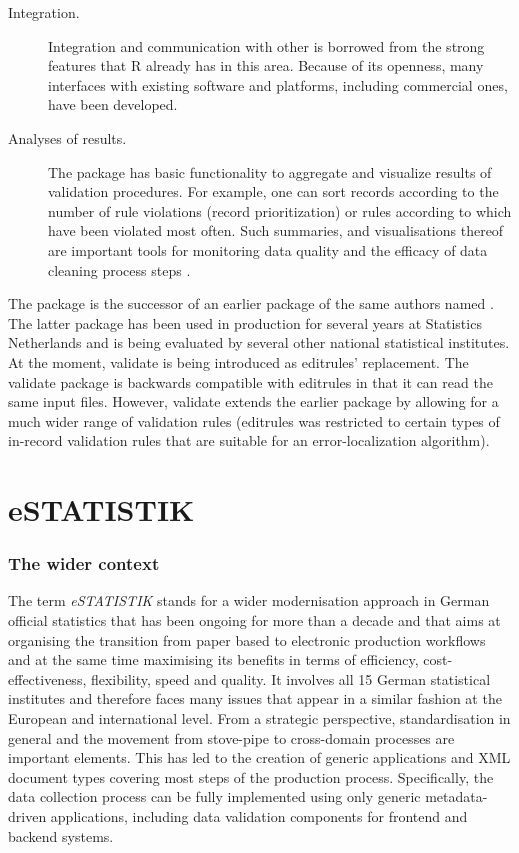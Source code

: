 \begin{description}
\item[Integration.] Integration and communication with other is borrowed from
the strong features that R already has in this area. Because of its openness,
many interfaces with existing software and platforms, including commercial
ones, have been developed.

\item[Analyses of results.] The package has basic functionality to aggregate and
visualize results of validation  procedures. For example, one can sort records
according to the number of rule violations (record prioritization) or rules
according to which have been violated most often. Such summaries, and visualisations
thereof are important tools for monitoring data quality and the efficacy of 
data cleaning process steps \citep{pannekoek:2014}.
\end{description}

The  package is the successor of an earlier package of the same
authors named . The latter package has been used in production
for several years at Statistics Netherlands and is being evaluated by several
other national statistical institutes. At the moment, validate is being
introduced as editrules' replacement. The validate package is backwards
compatible with editrules in that it can read the same input files. However,
validate extends the earlier package by allowing for a much wider range of
validation rules (editrules was restricted to certain types of in-record
validation rules that are suitable for an error-localization algorithm).




\section{eSTATISTIK}

\subsubsection{The wider context}
The term \textit{eSTATISTIK} stands for a wider modernisation approach in German official statistics that has been ongoing for more than a decade and that aims at organising the transition from paper based to electronic production workflows and at the same time maximising its benefits in terms of efficiency, cost-effectiveness, flexibility, speed and quality. It involves all 15 German statistical institutes and therefore faces many issues that appear in a similar fashion at the European and international level. From a strategic perspective, standardisation in general and the movement from stove-pipe to cross-domain processes are important elements. This has led to the creation of generic applications and XML document types covering most steps of the production process. Specifically, the data collection process can be fully implemented using only generic metadata-driven applications, including data validation components for frontend and backend systems.

